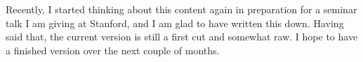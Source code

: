 \documentclass[
11pt, %
a4paper, %
oneside, %
headinclude,footinclude, %
BCOR5mm, %
]{scrartcl}
\begin{document}
Recently, I started thinking about this content again in preparation for a seminar talk I am giving at Stanford, and I am glad to have written this down. Having said that, the current version is still a first cut and somewhat raw. I hope to have a finished version over the next couple of months.


\renewcommand{\refname}{\spacedlowsmallcaps{References}} %




\end{document}
